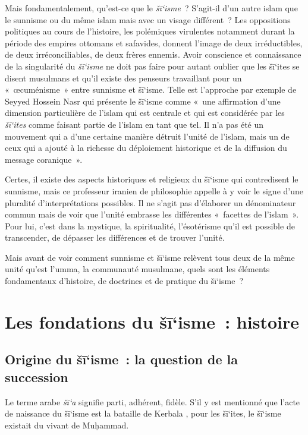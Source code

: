 Mais fondamentalement, qu'est-ce que le \emph{šī`isme}~? S'agit-il d'un
autre islam que le sunnisme ou du même islam mais avec un visage
différent~? Les oppositions politiques au cours de l'histoire, les
polémiques virulentes notamment durant la période des empires ottomans
et safavides, donnent l'image de deux irréductibles, de deux
irréconciliables, de deux frères ennemis. Avoir conscience et
connaissance de la singularité du \emph{šī`isme} ne doit pas faire pour
autant oublier que les šī`ites se disent musulmans et qu'il existe des
penseurs travaillant pour un «~œcuménisme~» entre sunnisme et šī`isme.
Telle est l'approche par exemple de Seyyed Hossein Nasr qui présente le
šī`isme comme «~une affirmation d'une dimension particulière de l'islam
qui est centrale et qui est considérée par les \emph{šī`ites} comme
faisant partie de l'islam en tant que tel. Il n'a pas été un mouvement
qui a d'une certaine manière détruit l'unité de l'islam, mais un de ceux
qui a ajouté à la richesse du déploiement historique et de la diffusion
du message coranique~».

Certes, il existe des aspects historiques et religieux du šī`isme qui
contredisent le sunnisme, mais ce professeur iranien de philosophie
appelle à y voir le signe d'une pluralité d'interprétations possibles.
Il ne s'agit pas d'élaborer un dénominateur commun mais de voir que
l'unité embrasse les différentes «~facettes de l'islam~». Pour lui,
c'est dans la mystique, la spiritualité, l'ésotérisme qu'il est possible
de transcender, de dépasser les différences et de trouver l'unité. 


Mais avant de voir comment sunnisme et šī`isme relèvent tous deux de la
même unité qu'est l'umma, la communauté musulmane, quels sont les
éléments fondamentaux d'histoire, de doctrines et de pratique du
šī`isme~?


\section{Les fondations du šī`isme~: histoire
}
\subsection{Origine du šī`isme~: la
question de la
succession}


Le terme arabe \emph{šī`a} signifie
parti, adhérent, fidèle. S'il y est mentionné que l'acte de naissance du
šī`isme est la bataille de Kerbala
, pour les šī`ites, le šī`isme
existait du vivant de Muḥammad.

